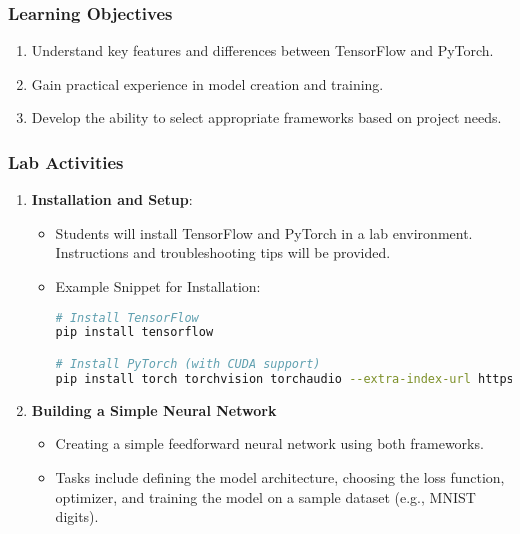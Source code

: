 \documentclass{beamer}
\begin{document}
\begin{frame}
    \frametitle{Learning Objectives}
    \begin{enumerate}
        \item Understand key features and differences between TensorFlow and PyTorch.
        \item Gain practical experience in model creation and training.
        \item Develop the ability to select appropriate frameworks based on project needs.
    \end{enumerate}
\end{frame}

\begin{frame}[fragile]
    \frametitle{Lab Activities}
    \begin{enumerate}
        \item \textbf{Installation and Setup}:
        \begin{itemize}
            \item Students will install TensorFlow and PyTorch in a lab environment. Instructions and troubleshooting tips will be provided.
            \item Example Snippet for Installation:
            \begin{lstlisting}[language=bash]
# Install TensorFlow
pip install tensorflow

# Install PyTorch (with CUDA support)
pip install torch torchvision torchaudio --extra-index-url https://download.pytorch.org/whl/cu113
            \end{lstlisting}
        \end{itemize}
        \item \textbf{Building a Simple Neural Network}
        \begin{itemize}
            \item Creating a simple feedforward neural network using both frameworks.
            \item Tasks include defining the model architecture, choosing the loss function, optimizer, and training the model on a sample dataset (e.g., MNIST digits).
        \end{itemize}
    \end{enumerate}
\end{frame}
\end{document}
